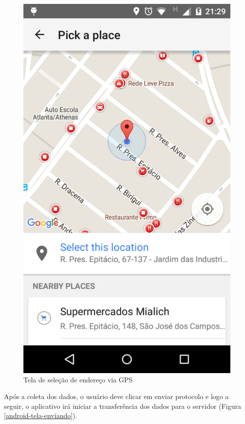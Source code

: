 \documentclass[
	article,			%
	11pt,				%
	oneside,			%
	a4paper,			%
	english,			%
	brazil,				%
	sumario=tradicional
	]{abntex2}
\begin{document}
\begin{figure}[!htbp]
\begin{minipage}{0.4\textwidth}
    \caption{\label{android-tela-gps}Tela de seleção de endereço via GPS}
    \includegraphics[scale=0.1]{android/4.png}
  \end{minipage}
\end{figure}


Após a coleta dos dados, o usuário deve clicar em enviar protocolo e logo a seguir, o aplicativo irá
iniciar a transferência dos dados para o servidor (Figura \ref{android-tela-enviando}).
\end{document}
